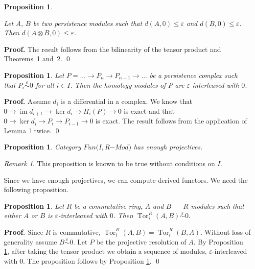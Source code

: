 \documentclass[english,12pt]{article}
\newcounter{stmcounter}[section]
\numberwithin{equation}{section}
\newtheorem{proposition}[stmcounter]{Proposition}
\theoremstyle{definition}
\theoremstyle{remark}
\newtheorem{remark}[stmcounter]{Remark}
\newenvironment{pf}{\noindent\textbf{Proof.}}{\qed}
\renewcommand{\leq}{\leqslant}
\begin{document}
\begin{proposition} ~ \par
  \label{prop:tensor}
  Let $A$, $B$ be two persistence modules such that $d(A,0) \leq \varepsilon$ and $d(B,0) \leq \varepsilon$. Then $d(A \otimes B,0) \leq \varepsilon$.
\end{proposition}

\begin{pf}
  The result follows from the bilinearity of the tensor product and Theorems~1 and~2.
\end{pf}

\begin{proposition}
  \label{prop:hominter}
  Let $P = \ldots \to P_n \to P_{n-1} \to \ldots$ be a persistence complex such that $P_i \stackrel{\varepsilon}{\sim} 0$ for all $i \in I$. Then the homology modules of $P$ are $\varepsilon$-interleaved with $0$.
\end{proposition}

\begin{pf}
  Assume $d_i$ is a differential in a complex. We know that $0 \to \operatorname{im}{d_{i+1}} \to \ker{d_{i}} \to H_i(P) \to 0$ is exact and that $0 \to \ker{d_i} \to P_i \to P_{i-1} \to 0$ is exact. The result follows from the application of Lemma 1 twice.
\end{pf}\\

\begin{proposition}
  Category $Fun(I, $R$-Mod)$ has enough projectives.
\end{proposition}

\begin{remark}
 This proposition is known to be true without conditions on $I$. {\cite[Page 2]{Mitchell81}}
\end{remark}

Since we have enough projectives, we can compute derived functors. We need the following proposition.\\

\begin{proposition}
  \label{prop:tor}
  Let $R$ be a commutative ring, $A$ and $B$ --- $R$-modules such that either $A$ or $B$ is $\varepsilon$-interleaved with $0$. Then $\operatorname{Tor}_i^R(A,B) \stackrel{\varepsilon}{\sim} 0$.
\end{proposition}

\begin{pf}
  Since $R$ is commutative, $\operatorname{Tor}_i^R(A,B) = \operatorname{Tor}_i^R(B,A)$. Without loss of generality assume $B \stackrel{\varepsilon}{\sim} 0$. Let $P$ be the projective resolution of $A$. By Proposition \ref{prop:tensor}, after taking the tensor product we obtain a sequence of modules, $\varepsilon$-interleaved with $0$. The proposition follows by Proposition \ref{prop:hominter}.
\end{pf}\\
\end{document}
